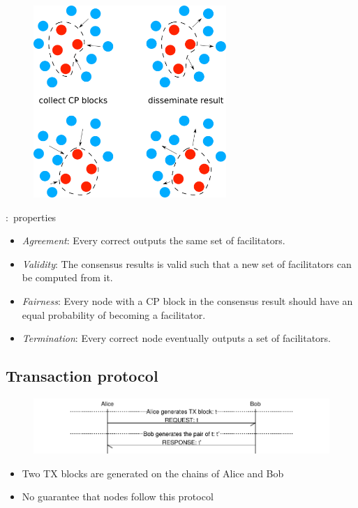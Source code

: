 \documentclass{beamer}
\begin{document}
\begin{frame}{\subsecname}
  \begin{figure}
    \includegraphics[width=0.65\textwidth]{consensus-overview}
    \centering
  \end{figure}
\end{frame}

\begin{frame}{\subsecname:~properties}
\label{def:consensus}
\begin{itemize}
    \item \emph{Agreement}:
        Every correct outputs the same set of facilitators.
    \item \emph{Validity}:
      The consensus results is valid such that a new set of facilitators can be computed from it.
    \item \emph{Fairness}:
        Every node with a CP block in the consensus result should have an equal probability of becoming a facilitator.
    \item \emph{Termination}:
        Every correct node eventually outputs a set of facilitators.
\end{itemize}
\end{frame}

\subsection{Transaction protocol}
\begin{frame}{\subsecname}
  \begin{figure}[h]
  \includegraphics[width=1.0\textwidth]{tx-proto}
  \centering
  \end{figure}
\begin{itemize}
\item Two TX blocks are generated on the chains of Alice and Bob
\item No guarantee that nodes follow this protocol
\end{itemize}
\end{frame}
\end{document}
